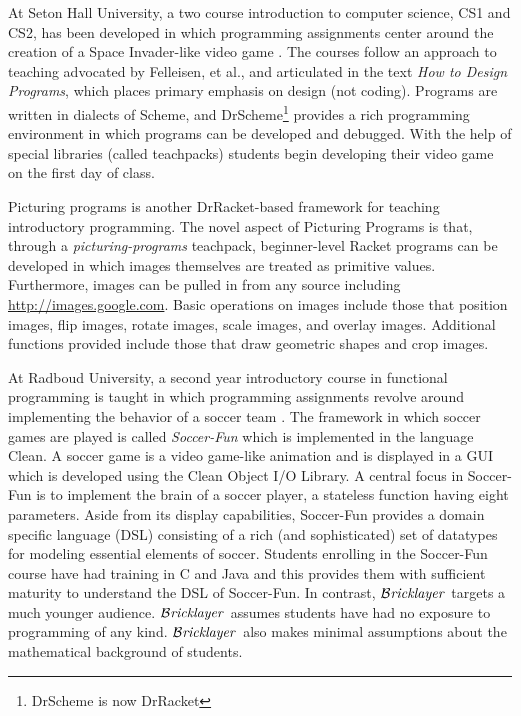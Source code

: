 \documentclass[submission,copyright,creativecommons]{eptcs}
\newcommand{\bricklayer}{\ensuremath{\mathcal{B}\emph{ricklayer}}}
\begin{document}
At Seton Hall University, a two course introduction to computer science, CS1 and CS2, has been developed in which programming assignments center around the creation of a Space Invader-like video game \cite{Morazan:Functional-Video-Games}. The courses follow an approach to teaching advocated by Felleisen, et al., and articulated in the text \emph{How to Design Programs}\cite{Felleisen:How-to-Design-Programs}, which places primary emphasis on design (not coding). Programs are written in dialects of Scheme, and DrScheme\footnote{DrScheme is now DrRacket} provides a rich programming environment in which programs can be developed and debugged. With the help of special libraries (called teachpacks) students begin developing their video game on the first day of class.

Picturing programs \cite{Bloch:Picturing-Programs} is another DrRacket-based framework for teaching introductory programming. The novel aspect of Picturing Programs is that, through a \emph{picturing-programs} teachpack, beginner-level Racket programs can be developed in which images themselves are treated as primitive values. Furthermore, images can be pulled in from any source including \url{http://images.google.com}. Basic operations on images include those that position images, flip images, rotate images, scale images, and overlay images. Additional functions provided include those that draw geometric shapes and crop images.


At Radboud University, a second year introductory course in functional programming is taught in which programming assignments revolve around implementing the behavior of a soccer team \cite{Achten:2011:SP:1972805.1972806}. The framework in which soccer games are played is called \emph{Soccer-Fun} which is implemented in the language Clean. A soccer game is a video game-like animation and is displayed in a GUI which is developed using the Clean Object I/O Library\cite{achten:CleanIO}. A central focus in Soccer-Fun is to implement the brain of a soccer player, a stateless function having eight parameters. Aside from its display capabilities, Soccer-Fun provides a domain specific language (DSL) consisting of a rich (and sophisticated) set of datatypes for modeling essential elements of soccer.  Students enrolling in the Soccer-Fun course have had training in C and Java and this provides them with sufficient maturity to understand the DSL of Soccer-Fun. In contrast, \bricklayer\ targets a much younger audience. \bricklayer\ assumes students have had no exposure to programming of any kind. \bricklayer\ also makes minimal assumptions about the mathematical background of students.
\end{document}
